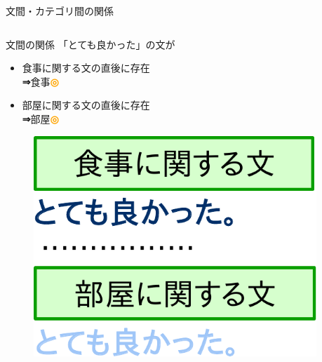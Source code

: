 \documentclass[aspectratio=43,unicode,10pt]{beamer}
\newcommand{\then}{\textcolor{ttiblue}{\textbf{⇒}}\hspace{1ex}}
\newcommand{\good}{\textcolor{orange}{\textbf{◎}}\hspace{1ex}}
\begin{document}
\begin{frame}{文間・カテゴリ間の関係}{}
  \begin{columns}[t]
    \begin{column}{0.6\textwidth}
      \begin{block}{文間の関係}
        「とても良かった」の文が
        \begin{itemize}
          \item 食事に関する文の直後に存在 \\
                \then 食事\good
          \item 部屋に関する文の直後に存在 \\
                \then 部屋\good
        \end{itemize}
        \begin{figure}
          \includegraphics[width=0.6\linewidth]
                          {fig/global_relations_among_sentences_v2.pdf}
        \end{figure}
      \end{block}
    \end{column}
    \begin{column}{0.4\textwidth}
\end{column}
\end{columns}
\end{frame}
\end{document}
